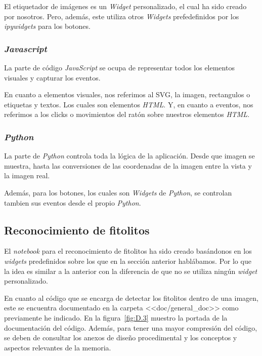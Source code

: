 El etiquetador de imágenes es un \textit{Widget} personalizado, el cual ha sido creado por nosotros. Pero, además, este utiliza otros \textit{Widgets} prefedefinidos por los \textit{ipywidgets} para los botones.

\subsubsection{\textit{Javascript}}

La parte de código \textit{JavaScript} se ocupa de representar todos los elementos visuales y capturar los eventos.

En cuanto a elementos visuales, nos referimos al SVG, la imagen, rectangulos o etiquetas y textos. Los cuales son elementos \textit{HTML}. Y, en cuanto a eventos, nos referimos a los clicks o movimientos del ratón sobre nuestros elementos \textit{HTML}.

\subsubsection{\textit{Python}}

La parte de \textit{Python} controla toda la lógica de la aplicación. Desde que imagen se muestra, hasta las conversiones de las coordenadas de la imagen entre la vista y la imagen real.

Además, para los botones, los cuales son \textit{Widgets} de \textit{Python}, se controlan tambien sus eventos desde el propio \textit{Python}.

\subsection{Reconocimiento de fitolitos}

El \textit{notebook} para el reconocimiento de fitolitos ha sido creado basándonos en los \textit{widgets} predefinidos sobre los que en la sección anterior hablábamos. Por lo que la idea es similar a la anterior con la diferencia de que no se utiliza ningún \textit{widget} personalizado.

En cuanto al código que se encarga de detectar los fitolitos dentro de una imagen, este se encuentra documentado en la carpeta <<doc/general\_doc>> como previamente he indicado. En la figura~\ref{fig:D.3} muestro la portada de la documentación del código. Además, para tener una mayor compresión del código, se deben de consultar los anexos de diseño procedimental y los conceptos y aspectos relevantes de la memoria.

